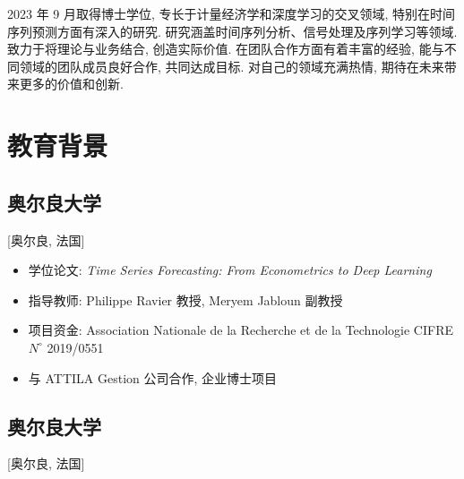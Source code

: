 \documentclass{mycv}
\begin{document}
\maketitle

\begin{summary}
  2023 年 9 月取得博士学位, 专长于计量经济学和深度学习的交叉领域, 特别在时间序列预测方面有深入的研究. 研究涵盖时间序列分析、信号处理及序列学习等领域. 致力于将理论与业务结合, 创造实际价值. 在团队合作方面有着丰富的经验, 能与不同领域的团队成员良好合作, 共同达成目标. 对自己的领域充满热情, 期待在未来带来更多的价值和创新.
\end{summary}

\vspace{-1em}

\section{教育背景}

\subsection{\large 奥尔良大学}[奥尔良, 法国]

\begin{positions}
\end{positions}

\begin{itemize}
  \itemsep 0em
  \item 学位论文: \textit{Time Series Forecasting: From Econometrics to Deep Learning}
  \item 指导教师: Philippe Ravier 教授, Meryem Jabloun 副教授
  \item 项目资金: Association Nationale de la Recherche et de la Technologie CIFRE $N^{\circ}$ 2019/0551
  \item 与 ATTILA Gestion 公司合作, 企业博士项目
\end{itemize}

\vspace{-\parskip}

\subsection{\large 奥尔良大学}[奥尔良, 法国]

\begin{positions}
\end{positions}
\end{document}
